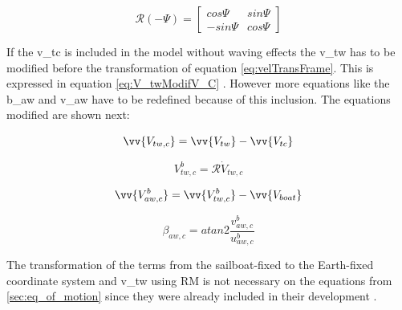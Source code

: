 \begin{equation} \label{eq:RotMat}
    \mathcal{R}(- \Psi)=
    \begin{bmatrix}
    cos \Psi & sin\Psi \\
    -sin \Psi & cos \Psi
    \end{bmatrix}
\end{equation}

If the \acrshort{v_tc} is included in the model without waving effects the \acrshort{v_tw} has to be modified before the transformation of equation \ref{eq:velTransFrame}. This is expressed in equation \ref{eq:V_twModifV_C} \cite{allsopp1998stochastic}. However more equations like the \acrshort{b_aw} and \acrshort{v_aw} have to be redefined because of this inclusion. The equations modified are shown next:\par
\begin{equation}\label{eq:V_twModifV_C}
    \vv{V_{tw,c}}=\vv{V_{tw}}- \vv{V_{tc}}
\end{equation}

\begin{equation}\label{eq:v_twCurBoat}
    V_{tw,c}^b=\mathcal{R} \dot V_{tw,c}
\end{equation}

\begin{equation} \label{eq:VelCurrWind_boat}
    \vv{V_{aw,c}^b}= \vv{V_{tw,c}^b} - \vv{V_{boat}}
\end{equation}

\begin{equation}\label{eq:b_tw_c}
    \beta_{aw,c}= atan2 \frac {v_{aw,c}^b}{u_{aw,c}^b}
\end{equation}

The transformation of the terms from the sailboat-fixed to the Earth-fixed coordinate system and \acrshort{v_tw} using \acrshort{RM} is not necessary on the equations from \ref{sec:eq_of_motion} since they were already included in their development \cite{keuning2004mathematical}.\par  


